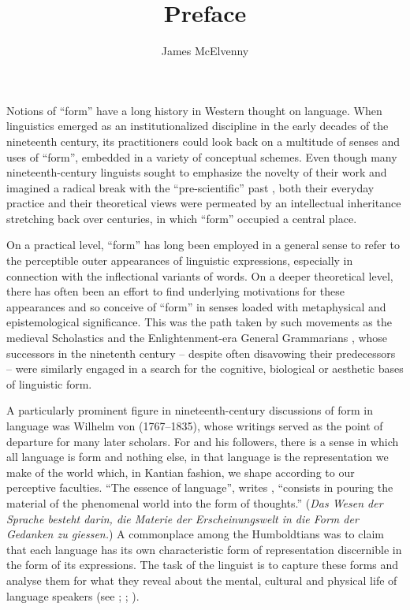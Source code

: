 \documentclass[output=paper]{langscibook}
\author{James McElvenny \affiliation{University of Edinburgh}}
\title{Preface}
\begin{document}
\maketitle
Notions of ``form'' have a long history in Western thought on language. When linguistics emerged as an institutionalized discipline in the early decades of the nineteenth century, its practitioners could look back on a multitude of senses and uses of ``form'', embedded in a variety of conceptual schemes. Even though many nineteenth-century linguists sought to emphasize the novelty of their work and imagined a radical break with the ``pre-scientific'' past \citep[see][chap. 1]{MorpurgoDavies1998}, both their everyday practice and their theoretical views were permeated by an intellectual inheritance stretching back over centuries, in which ``form'' occupied a central place.

On a practical level, ``form'' has long been employed in a general sense to refer to the perceptible outer appearances of linguistic expressions, especially in connection with the inflectional variants of words. On a deeper theoretical level, there has often been an effort to find underlying motivations for these appearances and so conceive of ``form'' in senses loaded with metaphysical and epistemological significance. This was the path taken by such movements as the medieval Scholastics and the Enlightenment-era General Grammarians \citep[see][chaps. 8 and 11]{Law2003}, whose successors in the ninetenth century -- despite often disavowing their predecessors -- were similarly engaged in a search for the cognitive, biological or aesthetic bases of linguistic form. 

A particularly prominent figure in nineteenth-century discussions of form in language was Wilhelm von {\Humboldt} (1767--1835), whose writings served as the point of departure for many later scholars. For {\Humboldt} and his followers, there is a sense in which all language is form and nothing else, in that language is the representation we make of the world which, in Kantian fashion, we shape according to our perceptive faculties. ``The essence of language'', writes \citet[17]{Humboldt19051820}, ``consists in pouring the material of the phenomenal world into the form of thoughts.'' (\emph{Das Wesen der Sprache besteht darin, die Materie der Erscheinungswelt in die Form der Gedanken zu giessen.}) A commonplace among the Humboldtians was to claim that each language has its own characteristic form of representation discernible in the form of its expressions. The task of the linguist is to capture these forms and analyse them for what they reveal about the mental, cultural and physical life of language speakers (see \citealt[chap. 5]{MorpurgoDavies1998}; \citealt{Trabant1986}; \citealt{McElvenny2016}). 
\end{document}
